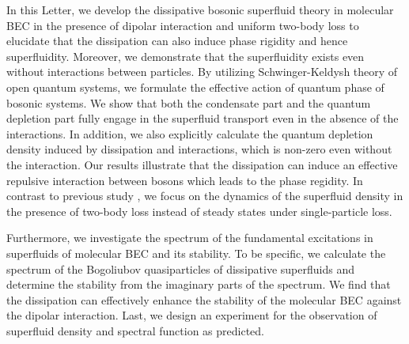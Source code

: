 \documentclass[aps,prl,twocolumn,superscriptaddress,]{revtex4-1}
\begin{document}
In this Letter, we develop the dissipative bosonic superfluid theory in molecular BEC in the presence of dipolar interaction and uniform two-body loss to elucidate that the dissipation can also induce phase rigidity and hence superfluidity. Moreover, we demonstrate that the superfluidity exists even without interactions between particles. By utilizing Schwinger-Keldysh theory of open quantum systems, we formulate the effective action of quantum phase of bosonic systems. We show that both the condensate part and the quantum depletion part fully engage in the superfluid transport even in the absence of the interactions. In addition, we also explicitly calculate the quantum depletion density induced by dissipation and interactions, which is non-zero even without the interaction. Our results illustrate that the dissipation can induce an effective repulsive interaction between bosons which leads to the phase regidity.
In contrast to previous study \cite{Diehl:2008aa}, we focus on the dynamics of the superfluid density in the presence of two-body loss instead of steady states under single-particle loss.

Furthermore, we investigate the spectrum of the fundamental excitations in superfluids of molecular BEC and its stability. To be specific, we calculate the spectrum of the Bogoliubov quasiparticles of dissipative superfluids and determine the stability from the imaginary parts of the spectrum. We find that the dissipation can effectively enhance the stability of the molecular BEC against the dipolar interaction. Last, we design an experiment for the observation of superfluid density
and spectral function as predicted. 

\end{document}
